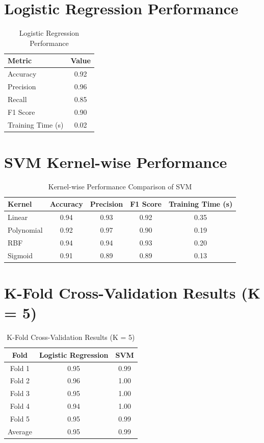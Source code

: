 \documentclass[11pt]{article}
\begin{document}
\section*{Logistic Regression Performance}
\begin{table}[H]
\centering
\renewcommand{\arraystretch}{1.3}
\caption{Logistic Regression Performance}
\begin{tabular}{|l|c|}
\hline
Metric & Value \\ \hline
Accuracy & 0.92 \\
Precision & 0.96 \\
Recall & 0.85 \\
F1 Score & 0.90 \\
Training Time (s) & 0.02 \\ \hline
\end{tabular}
\end{table}

\section*{SVM Kernel-wise Performance}
\begin{table}[H]
\centering
\renewcommand{\arraystretch}{1.3}
\caption{Kernel-wise Performance Comparison of SVM}
\begin{tabular}{|l|c|c|c|c|}
\hline
\textbf{Kernel} & \textbf{Accuracy} & \textbf{Precision} & \textbf{F1 Score} & \textbf{Training Time (s)} \\ 
\hline
Linear & 0.94 & 0.93 & 0.92 & 0.35 \\
Polynomial & 0.92 & 0.97 & 0.90 & 0.19 \\
RBF & 0.94 & 0.94 & 0.93 & 0.20 \\
Sigmoid & 0.91 & 0.89 & 0.89 & 0.13 \\ 
\hline
\end{tabular}
\end{table}

\section*{K-Fold Cross-Validation Results (K = 5)}
\begin{table}[H]
\centering
\renewcommand{\arraystretch}{1.3}
\caption{K-Fold Cross-Validation Results (K = 5)}
\begin{tabular}{|c|c|c|}
\hline
Fold & Logistic Regression & SVM \\ \hline
Fold 1 & 0.95 & 0.99 \\
Fold 2 & 0.96 & 1.00 \\
Fold 3 & 0.95 & 1.00 \\
Fold 4 & 0.94 & 1.00 \\
Fold 5 & 0.95 & 0.99 \\ \hline
Average & 0.95 & 0.99 \\ \hline
\end{tabular}
\end{table}
\end{document}
